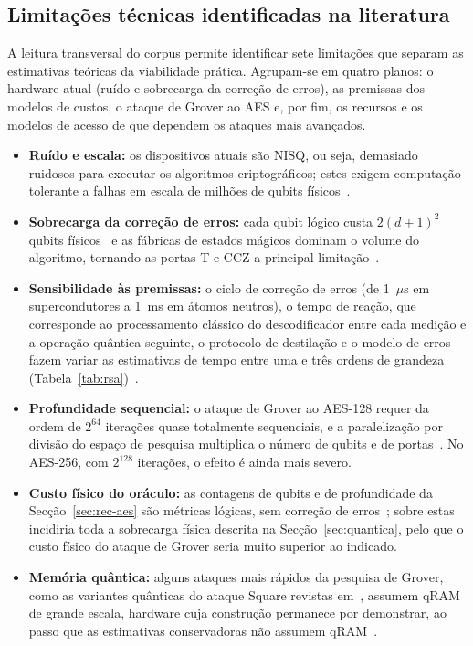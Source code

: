 \documentclass[11pt,a4paper]{article}
\begin{document}
\subsection{Limitações técnicas identificadas na literatura}\label{sec:limitacoes}

A leitura transversal do corpus permite identificar sete limitações que separam as estimativas teóricas da viabilidade prática. Agrupam-se em quatro planos: o hardware atual (ruído e sobrecarga da correção de erros), as premissas dos modelos de custos, o ataque de Grover ao AES e, por fim, os recursos e os modelos de acesso de que dependem os ataques mais avançados.

\begin{itemize}
\item \textbf{Ruído e escala:} os dispositivos atuais são NISQ, ou seja, demasiado ruidosos para executar os algoritmos criptográficos; estes exigem computação tolerante a falhas em escala de milhões de qubits físicos~\cite{oonishi2026,zhou2025}.
\item \textbf{Sobrecarga da correção de erros:} cada qubit lógico custa $2(d+1)^{2}$ qubits físicos~\cite{luongo2025,oonishi2026} e as fábricas de estados mágicos dominam o volume do algoritmo, tornando as portas T e CCZ a principal limitação~\cite{zhou2025,oonishi2026}.
\item \textbf{Sensibilidade às premissas:} o ciclo de correção de erros (de 1~$\mu$s em supercondutores a 1~ms em átomos neutros), o tempo de reação, que corresponde ao processamento clássico do descodificador entre cada medição e a operação quântica seguinte, o protocolo de destilação e o modelo de erros fazem variar as estimativas de tempo entre uma e três ordens de grandeza (Tabela~\ref{tab:rsa})~\cite{zhou2025,oonishi2026}.
\item \textbf{Profundidade sequencial:} o ataque de Grover ao AES-128 requer da ordem de $2^{64}$ iterações quase totalmente sequenciais, e a paralelização por divisão do espaço de pesquisa multiplica o número de qubits e de portas~\cite{huang2022}. No AES-256, com $2^{128}$ iterações, o efeito é ainda mais severo.
\item \textbf{Custo físico do oráculo:} as contagens de qubits e de profundidade da Secção~\ref{sec:rec-aes} são métricas lógicas, sem correção de erros~\cite{huang2022,liu2023}; sobre estas incidiria toda a sobrecarga física descrita na Secção~\ref{sec:quantica}, pelo que o custo físico do ataque de Grover seria muito superior ao indicado.
\item \textbf{Memória quântica:} alguns ataques mais rápidos da pesquisa de Grover, como as variantes quânticas do ataque Square revistas em~\cite{chethana2025}, assumem qRAM de grande escala, hardware cuja construção permanece por demonstrar, ao passo que as estimativas conservadoras não assumem qRAM~\cite{chethana2025}.

\end{itemize}
\end{document}
